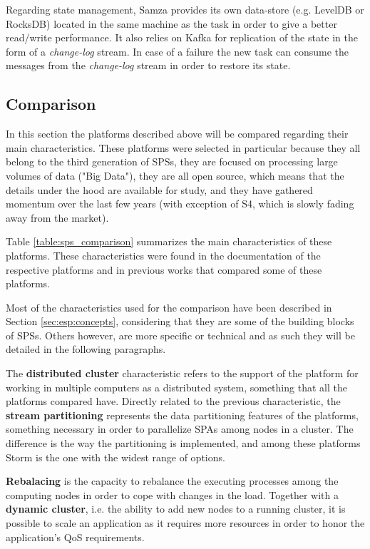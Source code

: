 \documentclass[ppgc,diss,english]{iiufrgs}
\begin{document}
Regarding state management, Samza provides its own data-store (e.g. LevelDB or RocksDB) located in the same machine as the task in order to give a better read/write performance. It also relies on Kafka for replication of the state in the form of a \emph{change-log} stream. In case of a failure the new task can consume the messages from the \emph{change-log} stream in order to restore its state.

\subsection{Comparison}

In this section the platforms described above will be compared regarding their main characteristics. These platforms were selected in particular because they all belong to the third generation of SPSs, they are focused on processing large volumes of data ("Big Data"), they are all open source, which means that the details under the hood are available for study, and they have gathered momentum over the last few years (with exception of S4, which is slowly fading away from the market).

Table \ref{table:sps_comparison} summarizes the main characteristics of these platforms. These characteristics were found in the documentation of the respective platforms and in previous works \cite{bockermann2014survey, gradvohl2014comparing, kamburugamuvesurvey} that compared some of these platforms.

Most of the characteristics used for the comparison have been described in Section \ref{sec:esp:concepts}, considering that they are some of the building blocks of SPSs. Others however, are more specific or technical and as such they will be detailed in the following paragraphs.

The \textbf{distributed cluster} characteristic refers to the support of the platform for working in multiple computers as a distributed system, something that all the platforms compared have. Directly related to the previous characteristic, the \textbf{stream partitioning} represents the data partitioning features of the platforms, something necessary in order to parallelize SPAs among nodes in a cluster. The difference is the way the partitioning is implemented, and among these platforms Storm is the one with the widest range of options.

\textbf{Rebalacing} is the capacity to rebalance the executing processes among the computing nodes in order to cope with changes in the load. Together with a \textbf{dynamic cluster}, i.e. the ability to add new nodes to a running cluster, it is possible to scale an application as it requires more resources in order to honor the application's QoS requirements.
\end{document}
